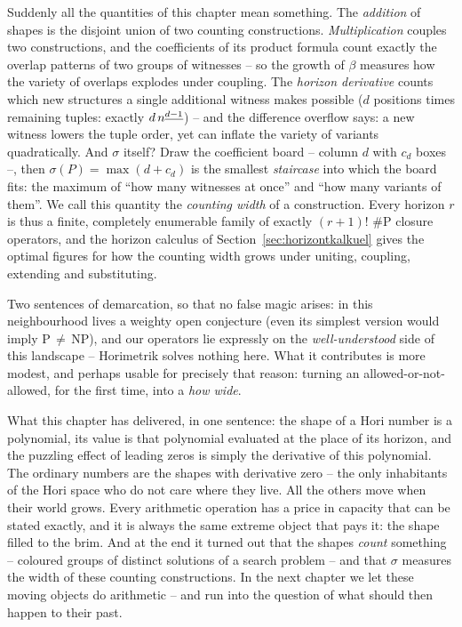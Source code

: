 Suddenly all the quantities of this chapter mean something. The
\emph{addition} of shapes is the disjoint union of two counting
constructions. \emph{Multiplication} couples two constructions,
and the coefficients of its product formula count exactly the
overlap patterns of two groups of witnesses -- so the growth of
$\beta$ measures how the variety of overlaps explodes under
coupling. The \emph{horizon derivative} counts which new
structures a single additional witness makes possible
($d$ positions times remaining tuples: exactly $d\,n^{\underline{d-1}}$) --
and the difference overflow says: a new witness lowers the tuple
order, yet can inflate the variety of variants quadratically.
And $\sigma$ itself? Draw the coefficient board -- column $d$ with
$c_d$ boxes --, then $\sigma(P)=\max(d+c_d)$ is the smallest
\emph{staircase} into which the board fits: the maximum of
``how many witnesses at once'' and ``how many variants of them''.
We call this quantity the \emph{counting width} of a
construction. Every horizon $r$ is thus a finite, completely
enumerable family of exactly $(r{+}1)!$
\#P closure operators, and the horizon calculus of
Section~\ref{sec:horizontkalkuel} gives the optimal figures for
how the counting width grows under uniting, coupling, extending
and substituting.

Two sentences of demarcation, so that no false magic arises: in
this neighbourhood lives a weighty open conjecture (even its
simplest version would imply P$\,\ne\,$NP), and our operators lie
expressly on the \emph{well-understood} side of this landscape --
Horimetrik solves nothing here. What it contributes is more
modest, and perhaps usable for precisely that reason: turning an
allowed-or-not-allowed, for the first time, into a \emph{how
wide}.

\begin{oberflaeche}
What this chapter has delivered, in one sentence: the shape of a
Hori number is a polynomial, its value is that polynomial
evaluated at the place of its horizon, and the puzzling effect of
leading zeros is simply the derivative of this polynomial. The
ordinary numbers are the shapes with derivative zero -- the only
inhabitants of the Hori space who do not care where they live.
All the others move when their world grows. Every arithmetic
operation has a price in capacity that can be stated exactly, and
it is always the same extreme object that pays it: the shape
filled to the brim. And at the end it turned out that the shapes
\emph{count} something -- coloured groups of distinct solutions
of a search problem -- and that $\sigma$ measures the width of
these counting constructions. In the next chapter we let these
moving objects do arithmetic -- and run into the question of what
should then happen to their past.
\end{oberflaeche}
